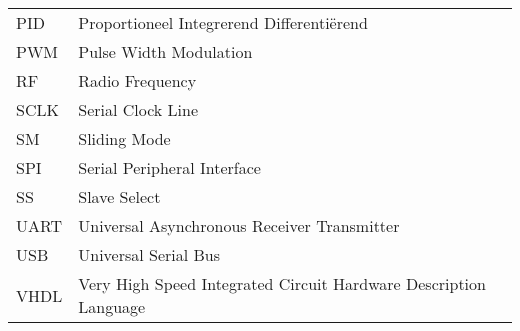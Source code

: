 \begin{flushleft}
\begin{tabularx}{\textwidth}{@{}p{12mm}X@{}}
			PID						& Proportioneel Integrerend Differenti\"erend	\\
			PWM						& Pulse Width Modulation\\
			RF						& Radio Frequency\\
			SCLK					& Serial Clock Line\\
			SM						& Sliding Mode	\\
			SPI 					& Serial Peripheral Interface\\		
			SS 						& Slave Select\\
			UART 					& Universal Asynchronous Receiver Transmitter\\		
			USB						& Universal Serial Bus\\		
			VHDL					& Very High Speed Integrated Circuit Hardware Description Language\\




  \end{tabularx}
\end{flushleft}